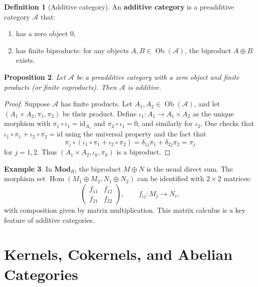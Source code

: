 \documentclass[a4paper,12pt]{book}
\DeclareMathOperator{\Hom}{Hom}
\DeclareMathOperator{\Ob}{Ob}
\newcommand{\Mod}{\mathbf{Mod}}
\newcommand{\id}{\mathrm{id}}
\theoremstyle{definition}
\newtheorem{definition}{Definition}[section]
\newtheorem{example}[definition]{Example}
\theoremstyle{plain}
\newtheorem{proposition}[definition]{Proposition}
\theoremstyle{remark}
\begin{document}
\begin{definition}[Additive category]\label{def:additive-cat}
An \textbf{additive category} is a preadditive category $\mathcal{A}$ that:
\begin{enumerate}
    \item has a zero object $0$,
    \item has finite biproducts: for any objects $A, B \in \Ob(\mathcal{A})$,
    the biproduct $A \oplus B$ exists.
\end{enumerate}
\end{definition}

\begin{proposition}\label{prop:additive-criterion}
Let $\mathcal{A}$ be a preadditive category with a zero object and finite products
(or finite coproducts). Then $\mathcal{A}$ is additive.
\end{proposition}

\begin{proof}
Suppose $\mathcal{A}$ has finite products. Let $A_1, A_2 \in \Ob(\mathcal{A})$,
and let $(A_1 \times A_2, \pi_1, \pi_2)$ be their product. Define
$\iota_1 \colon A_1 \to A_1 \times A_2$ as the unique morphism with
$\pi_1 \circ \iota_1 = \id_{A_1}$ and $\pi_2 \circ \iota_1 = 0$,
and similarly for $\iota_2$. One checks that $\iota_1 \circ \pi_1 + \iota_2 \circ \pi_2 = \id$
using the universal property and the fact that
\[
    \pi_j \circ (\iota_1 \circ \pi_1 + \iota_2 \circ \pi_2) = \delta_{1j}\pi_1 + \delta_{2j}\pi_2 = \pi_j
\]
for $j = 1, 2$. Thus $(A_1 \times A_2, \iota_k, \pi_k)$ is a biproduct.
\end{proof}

\begin{example}\label{ex:biproduct-matrix}
In $\Mod_R$, the biproduct $M \oplus N$ is the usual direct sum. The morphism set
$\Hom(M_1 \oplus M_2, N_1 \oplus N_2)$ can be identified with $2 \times 2$ matrices:
\[
    \begin{pmatrix} f_{11} & f_{12} \\ f_{21} & f_{22} \end{pmatrix},
    \qquad f_{ij} \colon M_j \to N_i,
\]
with composition given by matrix multiplication. This matrix calculus is a key
feature of additive categories.
\end{example}


\section{Kernels, Cokernels, and Abelian Categories}\label{sec:abelian-def}
\end{document}

